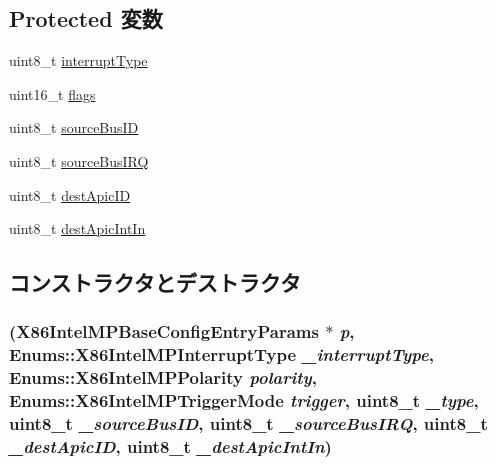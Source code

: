 \subsection*{Protected 変数}
\begin{DoxyCompactItemize}
\item 
uint8\_\-t \hyperlink{classX86ISA_1_1IntelMP_1_1IntAssignment_ae81d872177d4c17bcecf10ffa3ab786a}{interruptType}
\item 
uint16\_\-t \hyperlink{classX86ISA_1_1IntelMP_1_1IntAssignment_a1e87af3c18a2fd36c61faf89949bdc3f}{flags}
\item 
uint8\_\-t \hyperlink{classX86ISA_1_1IntelMP_1_1IntAssignment_ad70a0dd927dfd70e18da7df28dde0885}{sourceBusID}
\item 
uint8\_\-t \hyperlink{classX86ISA_1_1IntelMP_1_1IntAssignment_a13cc33d30a3ae974b4d675292ea67c0c}{sourceBusIRQ}
\item 
uint8\_\-t \hyperlink{classX86ISA_1_1IntelMP_1_1IntAssignment_aaf9fe26da601143d92e2cc36e2b98956}{destApicID}
\item 
uint8\_\-t \hyperlink{classX86ISA_1_1IntelMP_1_1IntAssignment_a83e89f73b271bad866e33a56db47dd08}{destApicIntIn}
\end{DoxyCompactItemize}


\subsection{コンストラクタとデストラクタ}
\hypertarget{classX86ISA_1_1IntelMP_1_1IntAssignment_aca4fa9c3c387158dc365f5ab07c5aae1}{
\subsubsection[{IntAssignment}]{ (X86IntelMPBaseConfigEntryParams $\ast$ {\em p}, \/  Enums::X86IntelMPInterruptType {\em \_\-interruptType}, \/  Enums::X86IntelMPPolarity {\em polarity}, \/  Enums::X86IntelMPTriggerMode {\em trigger}, \/  uint8\_\-t {\em \_\-type}, \/  uint8\_\-t {\em \_\-sourceBusID}, \/  uint8\_\-t {\em \_\-sourceBusIRQ}, \/  uint8\_\-t {\em \_\-destApicID}, \/  uint8\_\-t {\em \_\-destApicIntIn})}}
\label{classX86ISA_1_1IntelMP_1_1IntAssignment_aca4fa9c3c387158dc365f5ab07c5aae1}



